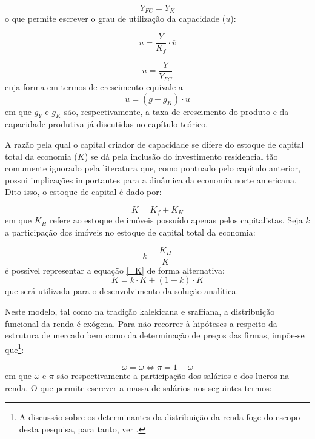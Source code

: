 \begin{equation}
\label{_YFC}
    Y_{FC} = Y_K
\end{equation}
o que permite escrever o grau de utilização da capacidade ($u$):

$$
u = \frac{Y}{K_f}\cdot \overline v
$$

\begin{equation}
\label{_u}
    u = \frac{Y}{Y_{FC}}
\end{equation}
cuja forma em termos de crescimento equivale a
\begin{equation}
\label{Aux}
\tag{Aux.}
\dot u = (g - g_K)\cdot u
\end{equation}
em que $g_Y$ e $g_K$ são, respectivamente, a taxa de crescimento do produto e da capacidade produtiva já discutidas no capítulo teórico.

A razão pela qual o capital criador de capacidade se difere do estoque de capital total da economia ($K$) se dá pela inclusão do investimento residencial tão comumente ignorado pela literatura que, como pontuado pelo capítulo anterior, possui implicações importantes para a dinâmica da economia norte americana. Dito isso, o estoque de capital é dado por:

\begin{equation}
\label{_K}
    K = K_f + K_{H}
\end{equation}
em que $K_H$ refere ao estoque de imóveis possuído apenas pelos capitalistas. Seja $k$ a participação dos imóveis no estoque de capital total da economia:

\begin{equation}
\label{_tau}
k = \frac{K_H}{K}    
\end{equation}
é possível representar a equação \ref{_K} de forma alternativa:
$$
K = k\cdot K + (1-k)\cdot K
$$
que será utilizada para o desenvolvimento da solução analítica.

Neste modelo, tal como na tradição kalekicana e sraffiana, a distribuição funcional da renda é exógena. Para não recorrer à hipóteses a respeito da estrutura de mercado bem como da determinação de preços das firmas, impõe-se que\footnote{A discussão sobre os determinantes da distribuição da renda foge do escopo desta pesquisa, para tanto, ver \textcite{pivetti_essay_1992}. }:

\begin{equation}
    \omega = \overline{\omega} \Leftrightarrow \pi = 1 - \overline{\omega}
\end{equation}
em que $\omega$ e $\pi$ são respectivamente a participação dos salários e dos lucros na renda. O que permite escrever a massa de salários nos seguintes termos:

